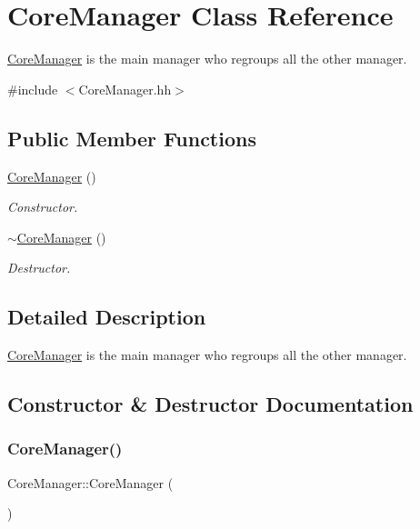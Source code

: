 \hypertarget{classCoreManager}{}\section{Core\+Manager Class Reference}
\label{classCoreManager}


\hyperlink{classCoreManager}{Core\+Manager} is the main manager who regroups all the other manager.  




{\ttfamily \#include $<$Core\+Manager.\+hh$>$}

\subsection*{Public Member Functions}
\begin{DoxyCompactItemize}
\item 
\hyperlink{classCoreManager_a0147fc3a8a8fca6b1f464d8b1257a304}{Core\+Manager} ()
\begin{DoxyCompactList}\small\item\em Constructor. \end{DoxyCompactList}\item 
\hyperlink{classCoreManager_ac3489a741174a8d5e09effe11df18100}{$\sim$\+Core\+Manager} ()
\begin{DoxyCompactList}\small\item\em Destructor. \end{DoxyCompactList}\end{DoxyCompactItemize}


\subsection{Detailed Description}
\hyperlink{classCoreManager}{Core\+Manager} is the main manager who regroups all the other manager. 

\subsection{Constructor \& Destructor Documentation}
\mbox{\label{classCoreManager_a0147fc3a8a8fca6b1f464d8b1257a304}} 
\subsubsection{\texorpdfstring{Core\+Manager()}{CoreManager()}}
{\footnotesize\ttfamily Core\+Manager\+::\+Core\+Manager (\begin{DoxyParamCaption}{ }\end{DoxyParamCaption})}



